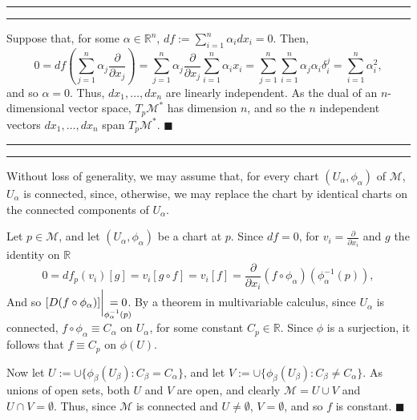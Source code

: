 \documentclass[11pt]{article}
\newcounter{questionCounter}
\newcounter{partCounter}[questionCounter]
\newenvironment{question}[2][\arabic{questionCounter}]{%
    \setcounter{partCounter}{0}%
    \vspace{.25in} \hrule \vspace{0.5em}%
        \noindent{\bf #2}%
    \vspace{0.8em} \hrule \vspace{.10in}%
    \addtocounter{questionCounter}{1}%
}{}
\renewcommand{\qed}{\quad \ensuremath{\blacksquare}}    %
\newcommand{\inv}{^{-1}}                %
\newcommand{\R}{\mathbb{R}}             %
\newcommand{\M}{\mathcal{M}}            %
\begin{document}
\begin{question}{Problem 4}
Suppose that, for some $\alpha \in \R^n$,
$\displaystyle df := \sum_{i = 1}^n \alpha_i dx_i = 0$. Then,
\[0
 = df\left( \sum_{j = 1}^n \alpha_j \frac{\partial}{\partial x_j} \right)
 = \sum_{j = 1}^n \alpha_j \frac{\partial}{\partial x_j}
        \sum_{i = 1}^n \alpha_i x_i
 = \sum_{j = 1}^n \sum_{i = 1}^n \alpha_j \alpha_i \delta_i^j
 = \sum_{i = 1}^n \alpha_i^2,
\]
and so $\alpha = 0$. Thus, $dx_1,\dots,dx_n$ are linearly independent. As the
dual of an $n$-dimensional vector space, $T_p\M^*$ has dimension $n$, and so
the $n$ independent vectors $dx_1,\dots,dx_n$ span $T_p\M^*$. \qed
\end{question}

\begin{question}{Problem 5}
Without loss of generality, we may assume that, for every chart
$(U_\alpha,\phi_\alpha)$ of $\M$, $U_\alpha$ is connected, since, otherwise, we
may replace the chart by identical charts on the connected components of
$U_\alpha$.

Let $p \in \M$, and let $(U_\alpha,\phi_\alpha)$ be a chart at $p$. Since
$df = 0$, for $v_i = \frac{\partial}{\partial x_i}$ and $g$ the identity on
$\R$
\[0
 = df_p(v_i)[g]
 = v_i[g \circ f]
 = v_i[f]
 = \frac{\partial}{\partial x_i} (f \circ \phi_\alpha)(\phi_\alpha\inv(p)),
\]
And so
$[D(f \circ \phi_\alpha)] \bigg|_{\phi_\alpha\inv(p)} \hspace{-0.8cm}= 0$. By a
theorem in multivariable calculus, since $U_\alpha$ is connected,
$f \circ \phi_\alpha \equiv C_\alpha$ on $U_\alpha$, for some constant $C_p \in \R$. Since $\phi$
is a surjection, it follows that $f \equiv C_p$ on $\phi(U)$.

Now let $U := \cup \{\phi_\beta(U_\beta) : C_\beta = C_\alpha\}$,
and let $V := \cup \{\phi_\beta(U_\beta) : C_\beta \neq C_\alpha\}$. As unions
of open sets, both $U$ and $V$ are open, and clearly $\M = U \cup V$ and
$U \cap V = \emptyset$. Thus, since $\M$ is connected and $U \neq \emptyset$,
$V = \emptyset$, and so $f$ is constant. \qed
\end{question}
\end{document}
